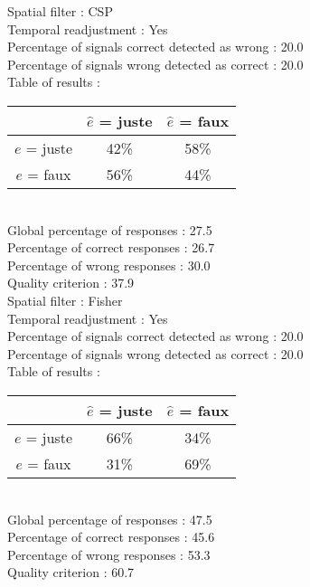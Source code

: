 Spatial filter : CSP \\
Temporal readjustment : Yes \\
Percentage of signals correct detected as wrong :   20.0 \\
Percentage of signals wrong detected as correct :   20.0 \\
Table of results : \\
\begin{tabular}{|c|c|c|}
\hline				& $\hat{e}$ = juste & $\hat{e}$ = faux \\
\hline  $e$ = juste	&     42\%			&     58\%		\\
\hline  $e$ = faux	&     56\%			&     44\%		\\
\hline
\end{tabular}\\
Global percentage of responses :   27.5 \\
Percentage of correct responses :   26.7 \\
Percentage of wrong responses :   30.0 \\
Quality criterion :   37.9 \\

Spatial filter : Fisher \\
Temporal readjustment : Yes \\
Percentage of signals correct detected as wrong :   20.0 \\
Percentage of signals wrong detected as correct :   20.0 \\
Table of results : \\
\begin{tabular}{|c|c|c|}
\hline				& $\hat{e}$ = juste & $\hat{e}$ = faux \\
\hline  $e$ = juste	&     66\%			&     34\%		\\
\hline  $e$ = faux	&     31\%			&     69\%		\\
\hline
\end{tabular}\\
Global percentage of responses :   47.5 \\
Percentage of correct responses :   45.6 \\
Percentage of wrong responses :   53.3 \\
Quality criterion :   60.7 \\

